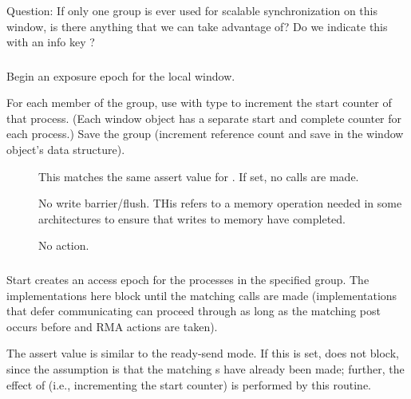 \documentclass{article}
\begin{document}
Question: If only one group is ever used for scalable synchronization on this
window, is there anything that we can take advantage of?  Do we indicate this
with an info key ?
\subsubsection{}
Begin an exposure epoch for the local window.

For each member of the group, use  with type
 to increment the start counter of that
process.  (Each window object has a separate start and complete counter for
each process.)
Save the group (increment reference count and save in the window object's data structure).


\begin{description}
\item[]This matches the same assert value for
  .  If set, no  calls are made.
\item[]No write barrier/flush.  THis refers to a
  memory operation needed in some architectures to ensure that writes to
  memory have completed.
\item[]No action.
\end{description}

\subsubsection{}
Start creates an access epoch for the processes in the specified group.  The
implementations here block until the matching  calls are
made (implementations that defer communicating can proceed through
 as long as the matching post occurs before and RMA
actions are taken).

The  assert value is similar to the ready-send
mode.  If this is set,  does not block, since the
assumption is that the matching s have already been
made; further, the effect of  (i.e., incrementing the
start counter) is performed by this routine.
\end{document}
